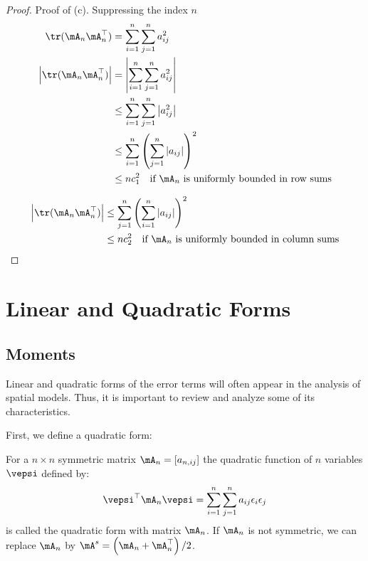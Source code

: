 \documentclass[english,12pt]{book}\usepackage[]{graphicx}\usepackage[]{xcolor}
\begin{document}
\begin{proof}
Proof of (c). Suppressing the index $n$
\begin{equation*}
  \begin{aligned}
    \tr(\mA_n\mA_n^\top)               & = \sum_{i = 1}^n\sum_{j=1}^n a_{ij}^2 \\
    \left|\tr(\mA_n\mA_n^\top)\right|  & = \left|\sum_{i = 1}^n\sum_{j=1}^n a_{ij}^2\right| \\
     & \leq \sum_{i = 1}^n\sum_{j=1}^n\left|a_{ij}^2\right| \\
     & \leq \sum_{i = 1}^n\left(\sum_{j=1}^n\left|a_{ij}\right|\right) ^2 \\
     & \leq  n c_1^2\quad \mbox{if $\mA_n$ is uniformly bounded in row sums}
  \end{aligned}
\end{equation*}


\begin{equation*}
  \begin{aligned}
    \left|\tr(\mA_n\mA_n^\top)\right|  & \leq \sum_{j = 1}^n\left(\sum_{i=1}^n\left|a_{ij}\right|\right) ^2 \\
     & \leq  n c_2^2\quad \mbox{if $\mA_n$ is uniformly bounded in column sums}
  \end{aligned}
\end{equation*}
\end{proof}

\section{Linear and Quadratic Forms}

\subsection{Moments}

Linear and quadratic forms of the error terms will often appear in the analysis of spatial models. Thus, it is important to review and analyze some of its characteristics.

First, we define a quadratic form:
\begin{definition}\label{def:quad-form}
For a $n\times n$ symmetric matrix $\mA_n=\left[a_{n, ij}\right]$ the quadratic function of $n$ variables $\vepsi$ defined by:
\begin{equation*}
\vepsi^\top \mA_n \vepsi = \sum_{i = 1}^n\sum_{j = 1}^na_{ij}\epsilon_i\epsilon_j
\end{equation*}
%
is called the quadratic form with matrix $\mA_n$.  If $\mA_n$ is not symmetric, we can replace $\mA_n$ by $\mA^s = \left(\mA_n + \mA_n^\top\right)/2$.
\end{definition}
\end{document}
